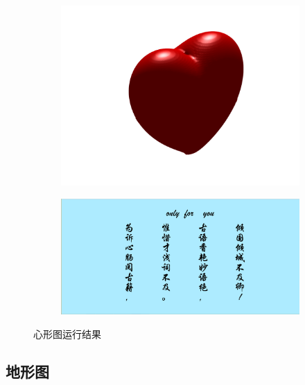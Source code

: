 \begin{figure}[htbp]
\begin{subfigure}[b]{0.4\textwidth}
                        \caption{}
                        \label{因你而精彩}
                    \end{subfigure}
                    \begin{subfigure}[b]{0.4\textwidth}
                        \includegraphics[width=\textwidth]{images/46.png}
                        \caption{}
                        \label{我的心满满的都是你}
                    \end{subfigure}
                    \begin{subfigure}[b]{0.4\textwidth}
                        \includegraphics[width=\textwidth]{images/47.png}
                        \caption{}
                        \label{onlyforyou}
                    \end{subfigure}
                    \caption{心形图运行结果}
                    \label{心形图运行结果}
                \end{figure}

    \subsection{地形图}

